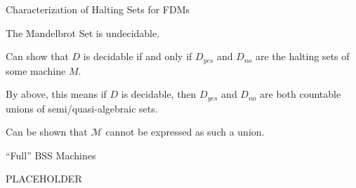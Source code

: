 \documentclass[c]{beamer}
\begin{document}
\begin{frame}{Characterization of Halting Sets for FDMs}
  \begin{corollary}
    The Mandelbrot Set is undecidable.
  \end{corollary}

  Can show that $D$ is decidable if and only if $D_{yes}$ and $D_{no}$
  are the halting sets of some machine $M$.\pause

  By above, this means if $D$ is decidable, then $D_{yes}$ and
  $D_{no}$ are both countable unions of semi/quasi-algebraic sets.\pause

  Can be shown that $\mathcal{M}$ cannot be expressed as such a union.

\end{frame}

\begin{frame}{``Full'' BSS Machines}

  PLACEHOLDER

\end{frame}
\end{document}
